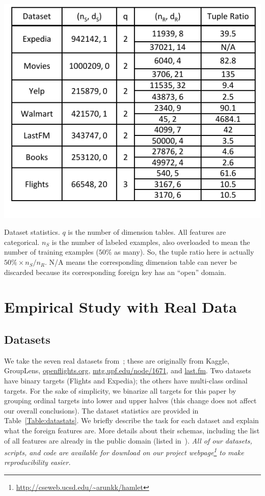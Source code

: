 \documentclass{vldb}
\begin{document}
\begin{table}[t]
\centering
\includegraphics[width=0.99\linewidth]{table1.pdf}
\caption{Dataset statistics. $q$ is the number of dimension tables. All features are categorical. $n_S$ is the number of labeled examples, also 
overloaded to mean the number of training examples ($50\%$ as many). So, the tuple ratio here is actually $50\% \times n_S / n_R$. N/A means the 
corresponding dimension table can never be discarded because its corresponding foreign key has an ``open'' domain.
}
\label{Table:datastats}
\end{table}


\section{Empirical Study with Real Data}

\subsection{Datasets}
We take the seven real datasets from~\cite{hamlet}; these are originally from Kaggle, GroupLens, \url{openflights.org}, \url{mtg.upf.edu/node/1671}, and \url{last.fm}.
Two datasets have binary targets (Flights and Expedia); the others have multi-class ordinal targets. For the sake of simplicity, we binarize all targets 
for this paper by grouping ordinal targets into lower and upper halves (this change does not affect our overall conclusions). 
The dataset statistics are provided in Table~\ref{Table:datastats}. 
We briefly describe the task for each dataset and explain what the foreign features are. More details about their schemas, including the list 
of all features are already in the public domain (listed in~\cite{hamlet}). 
\textit{All of our datasets, scripts, and code are available for download on our project webpage\footnote{\url{http://cseweb.ucsd.edu/~arunkk/hamlet}} to make reproducibility easier.}
\end{document}
